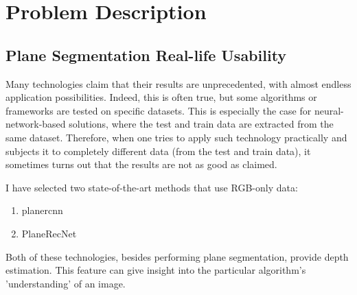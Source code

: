 
\chapter{Problem Description} \label{chap:problem-description}

\section{Plane Segmentation Real-life Usability}

Many technologies claim that their results are unprecedented, with almost endless application possibilities.
Indeed, this is often true, but some algorithms or frameworks are tested on specific datasets.
This is especially the case for neural-network-based solutions, where the test and train data are extracted from the same dataset.
Therefore, when one tries to apply such technology practically and subjects it to completely different data (from the test and train data), it sometimes turns out that the results are not as good as claimed.

\par

I have selected two state-of-the-art methods that use RGB-only data:

\begin{enumerate}
    \item planercnn \cite{articlePlaneRCNN}
    \item PlaneRecNet \cite{xie2021planerecnet}
\end{enumerate}

Both of these technologies, besides performing plane segmentation, provide depth estimation.
This feature can give insight into the particular algorithm's 'understanding' of an image.

